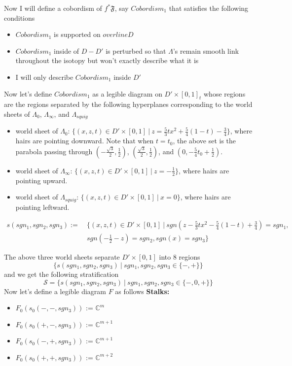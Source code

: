 Now I will define a cobordism of $f^*\mathfrak{F}$, say $Cobordism_1$ that satisfies the following conditions
\begin{itemize}
\item $Cobordism_1$ is supported on $overline{D}$

\item $Cobordism_1$ inside of $D-D'$ is perturbed so that $\Lambda$'s remain smooth link throughout the isotopy but won't exactly describe what it is

\item I will only describe $Cobordism_1$ inside $D'$
\end{itemize}
Now let's define $Cobordism_1$ as a legible diagram on $D'\times [0,1]_t$ whose regions are the regions separated by the following hyperplanes corresponding to the world sheets of $\Lambda_0$, $\Lambda_\infty$, and $\Lambda_{squig}$
\begin{itemize}
\item world sheet of $\Lambda_0$: 
$\{(x,z,t) \in D' \times [0,1] ~|~ z=\frac{5}{3}tx^2 + \frac{5}{4}(1-t)-\frac{3}{4}\}$, where hairs are pointing downward. Note that when $t=t_0$, the above set is the parabola passing through $(-\frac{\sqrt{3}}{2}, \frac{1}{2})$, $(\frac{\sqrt{3}}{2}, \frac{1}{2})$, and $(0,-\frac{5}{4}t_0 + \frac{1}{2})$.

\item world sheet of $\Lambda_\infty$: 
$\{(x,z,t) \in D' \times [0,1] ~|~ z=-\frac{1}{2} \}$, where hairs are pointing upward.

\item world sheet of $\Lambda_{squig}$:
$\{(x,z,t) \in D' \times [0,1] ~|~ x=0 \}$, where hairs are pointing leftward.
\end{itemize}
\begin{definition}
\begin{align*}
s(sgn_1,sgn_2,sgn_3) :=~ &\{(x,z,t) \in D' \times [0,1] ~|~ sgn(z-\frac{5}{3}tx^2-\frac{5}{4}(1-t)+\frac{3}{4}) = sgn_1, \\
& sgn(-\frac{1}{2}-z)=sgn_2,sgn(x)=sgn_3
	\}
\end{align*}
\end{definition}
The above three world sheets separate $D'\times [0,1]$ into $8$ regions
\[
	\{s(sgn_1,sgn_2,sgn_3) ~|~ sgn_1,sgn_2,sgn_3 \in \{-,+\}\}
\]
and we get the following stratification
\[
	\mathcal{S} = \{ s(sgn_1,sgn_2,sgn_3) ~|~ sgn_1,sgn_2, sgn_3 \in \{-,0,+\} \}
\]
Now let's define a legible diagram $F$ as follows
\textbf{Stalks:}
\begin{itemize}
\item $F_0(s_0(-,-,sgn_3))$ := $\mathbb{C}^{m}$
\item $F_0(s_0(+,-,sgn_3))$ := $\mathbb{C}^{m+1}$
\item $F_0(s_0(-,+,sgn_3))$ := $\mathbb{C}^{m+1}$
\item $F_0(s_0(+,+,sgn_3))$ := $\mathbb{C}^{m+2}$
\end{itemize}
